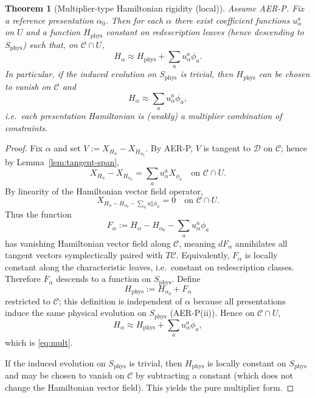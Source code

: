 \documentclass[11pt]{article}
\newtheorem{theorem}[definition]{Theorem}
\theoremstyle{remark}
\theoremstyle{plain}
\begin{document}
\begin{theorem}[Multiplier-type Hamiltonian rigidity (local)]
\label{thm:mult}
Assume AER-P. Fix a reference presentation $\alpha_0$.
Then for each $\alpha$ there exist coefficient functions $u_{\alpha}^a$ on $U$ and a function $H_{\mathrm{phys}}$ constant on redescription leaves (hence descending to $S_{\mathrm{phys}}$) such that, on $\mathcal{C}\cap U$,
\begin{equation}
H_{\alpha} \approx H_{\mathrm{phys}} + \sum_a u_{\alpha}^a \phi_a.
\label{eq:mult}
\end{equation}
In particular, if the induced evolution on $S_{\mathrm{phys}}$ is trivial, then $H_{\mathrm{phys}}$ can be chosen to vanish on $\mathcal{C}$ and
\begin{equation}
H_{\alpha}\approx \sum_a u_{\alpha}^a \phi_a,
\end{equation}
i.e.\ each presentation Hamiltonian is (weakly) a multiplier combination of constraints.
\end{theorem}

\begin{proof}
Fix $\alpha$ and set $V:=X_{H_{\alpha}}-X_{H_{\alpha_0}}$.
By AER-P, $V$ is tangent to $\mathcal{D}$ on $\mathcal{C}$; hence by Lemma~\ref{lem:tangent-span},
\begin{equation}
X_{H_{\alpha}}-X_{H_{\alpha_0}} = \sum_a u_{\alpha}^a X_{\phi_a}
\quad \text{on } \mathcal{C}\cap U.
\label{eq:Xdiff}
\end{equation}
By linearity of the Hamiltonian vector field operator,
\begin{equation}
X_{H_{\alpha}-H_{\alpha_0}-\sum_a u_{\alpha}^a\phi_a}=0
\quad \text{on } \mathcal{C}\cap U.
\end{equation}
Thus the function
\begin{equation}
F_{\alpha}:=H_{\alpha}-H_{\alpha_0}-\sum_a u_{\alpha}^a\phi_a
\end{equation}
has vanishing Hamiltonian vector field along $\mathcal{C}$, meaning $dF_{\alpha}$ annihilates all tangent vectors symplectically paired with $T\mathcal{C}$.
Equivalently, $F_{\alpha}$ is locally constant along the characteristic leaves, i.e.\ constant on redescription classes.
Therefore $F_{\alpha}$ descends to a function on $S_{\mathrm{phys}}$. Define
\begin{equation}
H_{\mathrm{phys}} := H_{\alpha_0} + F_{\alpha}
\end{equation}
restricted to $\mathcal{C}$; this definition is independent of $\alpha$ because all presentations induce the same physical evolution on $S_{\mathrm{phys}}$ (AER-P(ii)).
Hence on $\mathcal{C}\cap U$,
\begin{equation}
H_{\alpha} \approx H_{\mathrm{phys}} + \sum_a u_{\alpha}^a\phi_a,
\end{equation}
which is \eqref{eq:mult}.

If the induced evolution on $S_{\mathrm{phys}}$ is trivial, then $H_{\mathrm{phys}}$ is locally constant on $S_{\mathrm{phys}}$ and may be chosen to vanish on $\mathcal{C}$ by subtracting a constant (which does not change the Hamiltonian vector field). This yields the pure multiplier form.
\end{proof}
\end{document}
